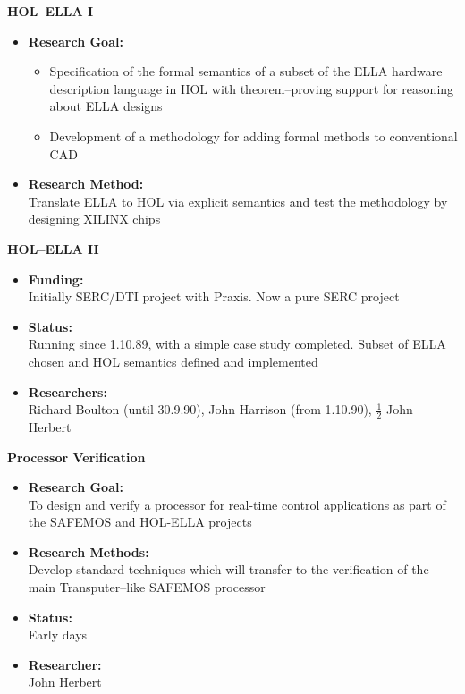 \begin{center}{\bf HOL--ELLA I}\end{center}
\begin{itemize}
\item {\bf Research Goal:} 
\begin{itemize}
\item Specification of the formal semantics of a subset of the
{\small ELLA} hardware description language in {\small HOL} with
theorem--proving support for reasoning about {\small ELLA} designs
\item Development of a methodology for adding formal methods to
conventional {\small CAD}
\end{itemize}
\item {\bf Research Method:} $\;$ \\
Translate {\small ELLA} to {\small HOL} via explicit semantics and 
test the methodology by designing {\small XILINX} chips
\end{itemize}

\begin{center}{\bf HOL--ELLA II}\end{center}
\begin{itemize}
\item {\bf Funding:} $\;$ \\
Initially {\small SERC/DTI} project with Praxis. Now a pure {\small SERC}
project
\item {\bf Status:}$\;$ \\
Running since 1.10.89, with a simple case study completed. Subset of 
{\small ELLA} chosen and {\small HOL} semantics defined and implemented
\item {\bf Researchers:} $\;$ \\
Richard Boulton (until 30.9.90), John Harrison (from 1.10.90), 
$\frac{1}{2}$ John Herbert
\end{itemize}

\begin{center}{\bf Processor Verification}\end{center}
\begin{itemize}
\item {\bf Research Goal:} $\;$ \\
To design and verify a processor for real-time control applications
as part of the {\small SAFEMOS} and {\small HOL-ELLA} projects
\item {\bf Research Methods:} $\;$ \\
Develop standard techniques which will transfer to the verification of the main
Transputer--like {\small SAFEMOS} processor
\item {\bf Status:}$\;$ \\
Early days
\item {\bf Researcher:} $\;$ \\
John Herbert
\end{itemize}


